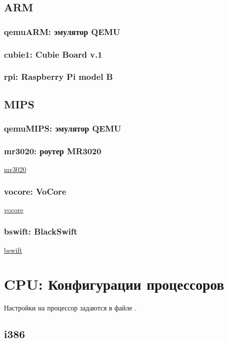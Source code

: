 
\subsection{ARM}

\subsubsection{qemuARM: эмулятор QEMU}
\subsubsection{cubie1: Cubie Board v.1}
\subsubsection{rpi: Raspberry Pi model B}
\subsection{MIPS}
\subsubsection{qemuMIPS: эмулятор QEMU}
\subsubsection{mr3020: роутер MR3020}
\href{http://wiki.openwrt.org/ru/toh/tp-link/tl-mr3020}{mr3020}
\subsubsection{vocore: VoCore} 
\href{http://vocore.io/}{vocore}
\subsubsection{bswift: BlackSwift}
\href{http://habrahabr.ru/post/242731/}{bswift} 

\section{CPU: Конфигурации процессоров}

Настройки на процессор задаются в файле .

\subsection{i386}

